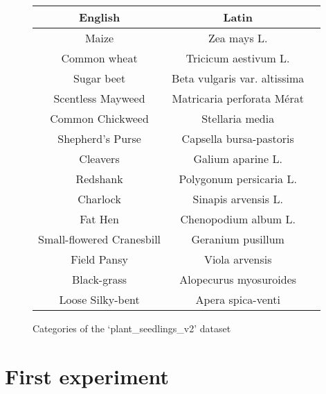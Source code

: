\begin{figure}[ht]
\centering
\begin{tabular}{|c|c|c|}
\hline
    English & Latin \\
\hline
    Maize & Zea mays L.\\
    Common wheat & Tricicum aestivum L.\\
    Sugar beet & Beta vulgaris var. altissima\\
    Scentless Mayweed & Matricaria perforata Mérat\\
    Common Chickweed & Stellaria media\\
    Shepherd’s Purse & Capsella bursa-pastoris\\
    Cleavers& Galium aparine L.\\
    Redshank& Polygonum persicaria L.\\
    Charlock& Sinapis arvensis L.\\
    Fat Hen& Chenopodium album L.\\
    Small-flowered Cranesbill & Geranium pusillum\\
    Field Pansy& Viola arvensis\\
    Black-grass& Alopecurus myosuroides\\
    Loose Silky-bent& Apera spica-venti\\
    \hline
\end{tabular}
\caption{Categories of the ‘plant\_seedlings\_v2’ dataset \cite{giselsson2017public} }
\label{tab:dataset_species}
\end{figure}



\section{First experiment}


